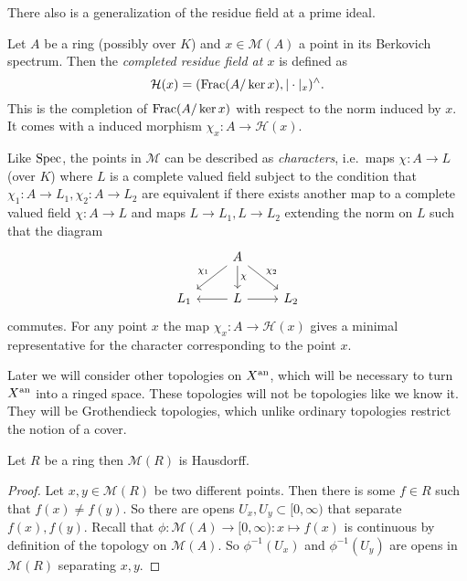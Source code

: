 There also is a generalization of the residue field at a prime ideal. 

\begin{definition}\label{def:completed_residue_field}
	Let $A$ be a ring (possibly over $K$) and $x \in \mathcal{M} (A)$ a point in its Berkovich spectrum. 
	Then the \emph{completed residue field at $x$} is defined as \[
		\mathcal{H} (x) = (\operatorname{Frac}(A / \ker x), |\cdot |_x)^{\wedge}
	.\] 
	This is the completion of $\operatorname{Frac}(A / \ker x)$ with respect to the norm induced by $x$. 
	It comes with a induced morphism $\chi_x: A \to \mathcal{H} (x)$.
\end{definition}

Like $\operatorname{Spec}$, the points in $\mathcal{M} $ can be described as \emph{characters}, i.e.\ maps $\chi: A \to L$ (over $K$) where $L$ is a complete valued field subject to the condition that $\chi_1: A \to L_1, \chi_2: A \to L_2$ are equivalent if there exists another map to a complete valued field $\chi: A \to L$  and maps $L \to L_1, L \to L_2$ extending the norm on $L$ such that the diagram 
\[
\begin{tikzcd}
	& A \ar{dl}[']{\chi_1} \ar{dr}{\chi_2} \dar{\chi} \\
	L_1 & L \lar \rar & L_2
\end{tikzcd}
\] 
commutes. 
For any point $x$ the map $\chi_x: A \to \mathcal{H} (x)$ gives a minimal representative for the character corresponding to the point $x$. 


\begin{remark}
	Later we will consider other topologies on $X{}^{\text{an}}$, which will be necessary to turn $X{}^{\text{an}} $ into a ringed space. 
	These topologies will not be topologies like we know it. They will be Grothendieck topologies, which unlike ordinary topologies restrict the notion of a cover. 
\end{remark}

\begin{proposition}\label{prop:spec_ring_haussdorf}
	Let $R$ be a ring then $\mathcal{M} (R)$ is Hausdorff. 
\end{proposition}
\begin{proof}
	Let $x, y \in \mathcal{M} (R)$ be two different points. 
	Then there is some $f \in R$ such that $f(x) \ne f(y)$. 
	So there are opens $U_x, U_y \subset  [0, \infty)$ that separate $f(x), f(y)$.
	Recall that $\phi: \mathcal{M} (A) \to [0, \infty): x \mapsto f(x)$ is continuous by definition of the topology on $\mathcal{M} (A)$. 
	So $\phi^{-1}(U_x)$ and $\phi^{-1}(U_y)$ are opens in $\mathcal{M} (R)$ separating $x,y$. 
\end{proof}



